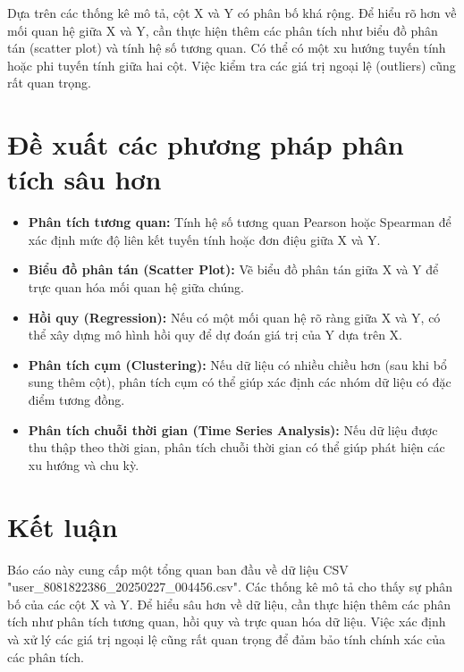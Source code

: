 \documentclass[12pt]{article}
\begin{document}
Dựa trên các thống kê mô tả, cột X và Y có phân bố khá rộng.  Để hiểu rõ hơn về mối quan hệ giữa X và Y, cần thực hiện thêm các phân tích như biểu đồ phân tán (scatter plot) và tính hệ số tương quan.  Có thể có một xu hướng tuyến tính hoặc phi tuyến tính giữa hai cột.  Việc kiểm tra các giá trị ngoại lệ (outliers) cũng rất quan trọng.

\section{Đề xuất các phương pháp phân tích sâu hơn}

\begin{itemize}
    \item \textbf{Phân tích tương quan:} Tính hệ số tương quan Pearson hoặc Spearman để xác định mức độ liên kết tuyến tính hoặc đơn điệu giữa X và Y.
    \item \textbf{Biểu đồ phân tán (Scatter Plot):}  Vẽ biểu đồ phân tán giữa X và Y để trực quan hóa mối quan hệ giữa chúng.
    \item \textbf{Hồi quy (Regression):} Nếu có một mối quan hệ rõ ràng giữa X và Y, có thể xây dựng mô hình hồi quy để dự đoán giá trị của Y dựa trên X.
    \item \textbf{Phân tích cụm (Clustering):}  Nếu dữ liệu có nhiều chiều hơn (sau khi bổ sung thêm cột), phân tích cụm có thể giúp xác định các nhóm dữ liệu có đặc điểm tương đồng.
    \item \textbf{Phân tích chuỗi thời gian (Time Series Analysis):} Nếu dữ liệu được thu thập theo thời gian, phân tích chuỗi thời gian có thể giúp phát hiện các xu hướng và chu kỳ.
\end{itemize}

\section{Kết luận}

Báo cáo này cung cấp một tổng quan ban đầu về dữ liệu CSV "user\_8081822386\_20250227\_004456.csv". Các thống kê mô tả cho thấy sự phân bố của các cột X và Y. Để hiểu sâu hơn về dữ liệu, cần thực hiện thêm các phân tích như phân tích tương quan, hồi quy và trực quan hóa dữ liệu.  Việc xác định và xử lý các giá trị ngoại lệ cũng rất quan trọng để đảm bảo tính chính xác của các phân tích.
\end{document}
